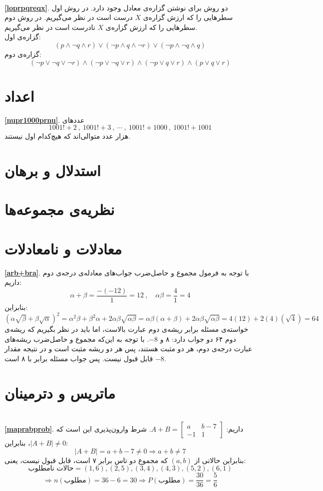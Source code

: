 \df \\ \textbf{\ref{loprpqreqx}}.
دو روش برای نوشتن گزاره‌ی معادل وجود دارد. در روش اول سطرهایی را که ارزش گزاره‌ی $X$ درست است در نظر می‌گیریم. در روش دوم سطرهایی را که ارزش گزاره‌ی $X$ نادرست است در نظر می‌گیریم. \\
گزاره‌ی اول:
$$(p \wedge \neg q \wedge r) \vee (\neg p \wedge q \wedge \neg r) \vee (\neg p \wedge \neg q \wedge q)$$
گزاره‌ی دوم:
$$(\neg p \vee \neg q \vee \neg r) \wedge (\neg p \vee \neg q \vee r) \wedge (\neg p \vee q \vee r) \wedge (p \vee q \vee r)$$
\section*{اعداد}
\textbf{\ref{nupr1000prnu}}.
عددهای
$$1001!+2 \ , \ 1001!+3 \ , \ \cdots \ , \ 1001!+1000 \ , \ 1001!+1001$$
هزار عدد متوالی‌اند که هیچ‌کدام اول نیستند.
\section*{استدلال و برهان}
\section*{نظریه‌ی مجموعه‌ها}
\section*{معادلات و نامعادلات}
\textbf{\ref{arb+bra}}.
با توجه به فرمول مجموع و حاصل‌ضرب جواب‌های معادله‌ی درجه‌ی دوم داریم:
$$\alpha + \beta = \frac{-(-12)}{1} = 12 \ , \quad \alpha \beta = \frac{4}{1} = 4$$
بنابراین:
$$(\alpha \sqrt{\beta} + \beta \sqrt{\alpha})^2 = \alpha^2\beta + \beta^2\alpha + 2\alpha\beta\sqrt{\alpha\beta} = \alpha\beta(\alpha+\beta)+2\alpha\beta\sqrt{\alpha\beta} = 4(12)+2(4)(\sqrt{4}) = 64$$
خواسته‌ی مسئله برابر ریشه‌ی دوم عبارت بالاست، اما باید در نظر بگیریم که ریشه‌ی دوم ۶۴ دو جواب دارد: ۸ و $-8$. با توجه به این‌که مجموع و حاصل‌ضرب ریشه‌های عبارت درجه‌ی دوم، هر دو مثبت هستند، پس هر دو ریشه مثبت است و در نتیجه مقدار $-8$ قابل قبول نیست. پس جواب مسئله برابر با ۸ است.
\section*{ماتریس و دترمینان}

\df \\ \textbf{\ref{maprabprob}}.
داریم:
$A+B=
\begin{bmatrix}
	a & b-7 \\
	-1 & 1
\end{bmatrix}$.
شرط وارون‌پذیری این است که
$|A+B| \neq 0$،
بنابراین:
$$|A+B|=a+b-7 \neq 0 \Rightarrow a+b \neq 7$$
بنابراین حالاتی از
$(a,b)$
که مجموع دو تاس برابر ۷ است، قابل قبول نیست، یعنی:
$$\text{حالات نامطلوب}={(1,6),(2,5),(3,4),(4,3),(5,2),(6,1)}$$
$$\Rightarrow n(\text{مطلوب}) =36-6=30 \Rightarrow P(\text{مطلوب})=\frac{30}{36}=\frac{5}{6}$$

